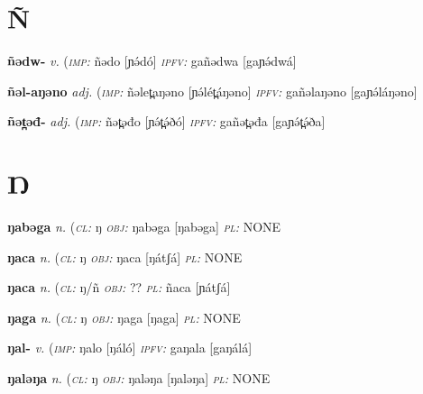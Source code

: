 {\section*{Ñ}\label{Ñ}

\newentry
\headword\textbf{ñədw-}  
\ipa{[ɲə́dw-]}
\synpos\textit{v.} 
\imperative(\textit {\textsc{imp:}} ñədo [ɲə́dó]
\imperfective\textit{\textsc{ipfv:}} gañədwa [gaɲə́dwá] 

\newentry
\headword\textbf{ñəl-aŋəno}  
\ipa{[ɲə́l-aŋəno]}
\synpos\textit{adj.} 
\imperative(\textit {\textsc{imp:}} ñəlet̪aŋəno [ɲə́lét̪áŋəno]
\imperfective\textit{\textsc{ipfv:}} gañəlaŋəno [gaɲə́láŋəno] 

\newentry
\headword\textbf{ñət̪əđ-}  
\ipa{[ɲə́t̪ə́ð-]}
\synpos\textit{adj.} 
\imperative(\textit {\textsc{imp:}} ñət̪əđo [ɲə́t̪ə́ðó]
\imperfective\textit{\textsc{ipfv:}} gañət̪əđa [gaɲə́t̪ə́ða] 


\section*{Ŋ}\label{Ŋ}


\newentry
\headword\textbf{ŋabəga}  
\ipa{[ŋabəga]}
\synpos\textit{n.} 
\class(\textit{\textsc{cl:}} {ŋ}
\object\textit{\textsc{obj:}} ŋabəga [ŋabəga]
\plural\textit{\textsc{pl:}} NONE  

\newentry
\headword\textbf{ŋaca}  
\ipa{[ŋátʃá]}
\synpos\textit{n.} 
\class(\textit{\textsc{cl:}} {ŋ}
\object\textit{\textsc{obj:}} ŋaca [ŋátʃá]
\plural\textit{\textsc{pl:}} NONE 

\newentry
\headword\textbf{ŋaca}  
\ipa{[ŋátʃá]}
\synpos\textit{n.} 
\class(\textit{\textsc{cl:}} {ŋ/ñ}
\object\textit{\textsc{obj:}} ??
\plural\textit{\textsc{pl:}} ñaca [ɲátʃá] 

\newentry
\headword\textbf{ŋaga}  
\ipa{[ŋaga]}
\synpos\textit{n.} 
\class(\textit{\textsc{cl:}} {ŋ}
\object\textit{\textsc{obj:}} ŋaga [ŋaga]
\plural\textit{\textsc{pl:}} NONE  

\newentry
\headword\textbf{ŋal-}  
\ipa{[ŋál-]}
\synpos\textit{v.} 
\imperative(\textit {\textsc{imp:}} ŋalo [ŋáló]
\imperfective\textit{\textsc{ipfv:}} gaŋala [gaŋálá] 

\newentry
\headword\textbf{ŋaləŋa}  
\ipa{[ŋaləŋa]}
\synpos\textit{n.} 
\class(\textit{\textsc{cl:}} {ŋ}
\object\textit{\textsc{obj:}} ŋaləŋa [ŋaləŋa]
\plural\textit{\textsc{pl:}} NONE

}
